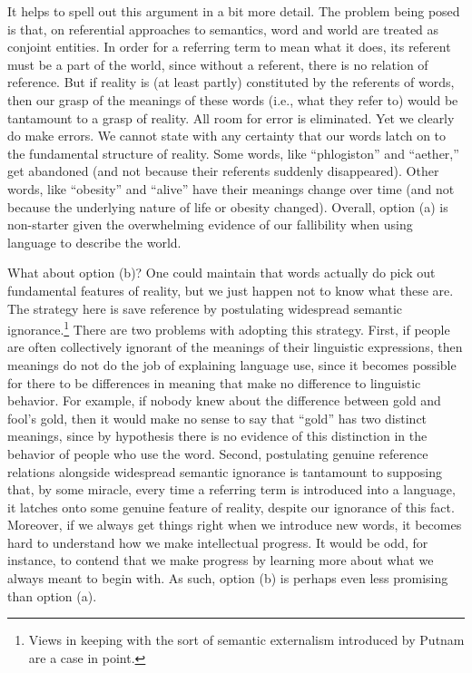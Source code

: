 It helps to spell out this argument in a bit more detail. The problem being posed is that, on referential approaches to semantics, word and world are treated as conjoint entities. In order for a referring term to mean what it does, its referent must be a part of the world, since without a referent, there is no relation of reference. But if reality is (at least partly) constituted by the referents of words, then our grasp of the meanings of these words (i.e., what they refer to) would be tantamount to a grasp of reality. All room for error is eliminated. Yet we clearly do make errors. We cannot state with any certainty that our words latch on to the fundamental structure of reality. Some words, like ``phlogiston'' and ``aether,'' get abandoned (and not because their referents suddenly disappeared). Other words, like ``obesity'' and ``alive'' have their meanings change over time (and not because the underlying nature of life or obesity changed). Overall, option (a) is non-starter given the overwhelming evidence of our fallibility when using language to describe the world.

What about option (b)? One could maintain that words actually do pick out fundamental features of reality, but we just happen not to know what these are. The strategy here is save reference by postulating widespread semantic ignorance.\footnote{Views in keeping with the sort of semantic externalism introduced by Putnam \citeyear{Putnam:1975} are a case in point.} There are two problems with adopting this strategy. First, if people are often collectively ignorant of the meanings of their linguistic expressions, then meanings do not do the job of explaining language use, since it becomes possible for there to be differences in meaning that make no difference to linguistic behavior. For example, if nobody knew about the difference between gold and fool's gold, then it would make no sense to say that ``gold'' has two distinct meanings, since by hypothesis there is no evidence of this distinction in the behavior of people who use the word. Second, postulating genuine reference relations alongside widespread semantic ignorance is tantamount to supposing that, by some miracle, every time a referring term is introduced into a language, it latches onto some genuine feature of reality, despite our ignorance of this fact. Moreover, if we always get things right when we introduce new words, it becomes hard to understand how we make intellectual progress. It would be odd, for instance, to contend that we make progress by learning more about what we always meant to begin with. As such, option (b) is perhaps even less promising than option (a).

